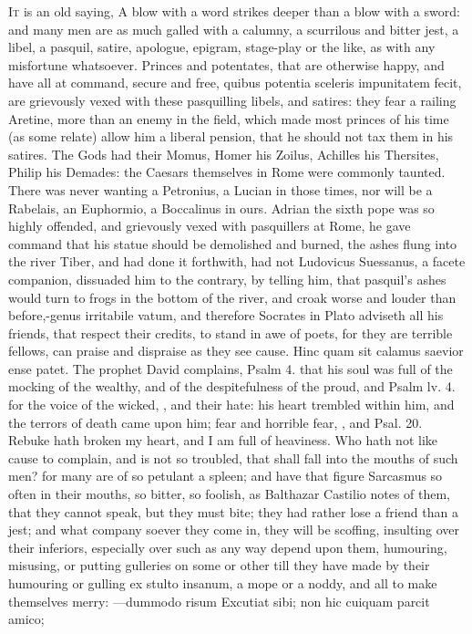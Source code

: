 {\lettrine{I}{t} is an old saying, A blow with a word strikes deeper than a
blow with a sword: and many men are as much galled with a calumny, a
scurrilous and bitter jest, a libel, a pasquil, satire, apologue,
epigram, stage-play or the like, as with any misfortune whatsoever.
Princes and potentates, that are otherwise happy, and have all at
command, secure and free, quibus potentia sceleris impunitatem fecit,
are grievously vexed with these pasquilling libels, and satires: they
fear a railing Aretine, more than an enemy in the field, which
made most princes of his time (as some relate) allow him a liberal
pension, that he should not tax them in his satires. The Gods had
their Momus, Homer his Zoilus, Achilles his Thersites, Philip his
Demades: the Caesars themselves in Rome were commonly taunted. There
was never wanting a Petronius, a Lucian in those times, nor will be a
Rabelais, an Euphormio, a Boccalinus in ours. Adrian the sixth pope
was so highly offended, and grievously vexed with pasquillers at
Rome, he gave command that his statue should be demolished and burned,
the ashes flung into the river Tiber, and had done it forthwith, had
not Ludovicus Suessanus, a facete companion, dissuaded him to the
contrary, by telling him, that pasquil's ashes would turn to frogs in
the bottom of the river, and croak worse and louder than before,-genus
irritabile vatum, and therefore Socrates in Plato adviseth all
his friends, that respect their credits, to stand in awe of poets, for
they are terrible fellows, can praise and dispraise as they see cause.
Hinc quam sit calamus saevior ense patet. The prophet David complains,
Psalm  4. that his soul was full of the mocking of the wealthy,
and of the despitefulness of the proud, and Psalm lv. 4. for the voice
of the wicked, \etc{}, and their hate: his heart trembled within him, and
the terrors of death came upon him; fear and horrible fear, \etc{}, and
Psal.  20. Rebuke hath broken my heart, and I am full of
heaviness. Who hath not like cause to complain, and is not so troubled,
that shall fall into the mouths of such men? for many are of so
petulant a spleen; and have that figure Sarcasmus so often in
their mouths, so bitter, so foolish, as Balthazar Castilio notes
of them, that they cannot speak, but they must bite; they had rather
lose a friend than a jest; and what company soever they come in, they
will be scoffing, insulting over their inferiors, especially over such
as any way depend upon them, humouring, misusing, or putting gulleries
on some or other till they have made by their humouring or gulling
ex stulto insanum, a mope or a noddy, and all to make themselves
merry:
---dummodo risum
Excutiat sibi; non hic cuiquam parcit amico;

}
